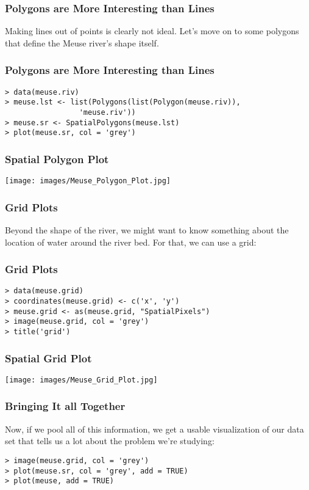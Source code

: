 \documentclass{beamer}
\begin{document}
\begin{frame}[fragile]
	\frametitle{Polygons are More Interesting than Lines}
	
	Making lines out of points is clearly not ideal. Let's move on to some polygons that define the Meuse river's shape itself.
\end{frame}

\begin{frame}[fragile]
	\frametitle{Polygons are More Interesting than Lines}

	\begin{verbatim}
> data(meuse.riv)
> meuse.lst <- list(Polygons(list(Polygon(meuse.riv)),
			     'meuse.riv'))
> meuse.sr <- SpatialPolygons(meuse.lst)
> plot(meuse.sr, col = 'grey')
	\end{verbatim}
\end{frame}

\frame
{	
	\frametitle{Spatial Polygon Plot}
	
	\begin{center}
		\texttt{[image: images/Meuse\_Polygon\_Plot.jpg]}
	\end{center}
}

\begin{frame}[fragile]
	\frametitle{Grid Plots}
	
	Beyond the shape of the river, we might want to know something about the location of water around the river bed. For that, we can use a grid:
\end{frame}

\begin{frame}[fragile]
	\frametitle{Grid Plots}
	
	\begin{verbatim}
> data(meuse.grid)
> coordinates(meuse.grid) <- c('x', 'y')
> meuse.grid <- as(meuse.grid, "SpatialPixels")
> image(meuse.grid, col = 'grey')
> title('grid')
	\end{verbatim}
\end{frame}

\frame
{	
	\frametitle{Spatial Grid Plot}
	
	\begin{center}
		\texttt{[image: images/Meuse\_Grid\_Plot.jpg]}
	\end{center}
}

\begin{frame}[fragile]
	\frametitle{Bringing It all Together}
	
	Now, if we pool all of this information, we get a usable visualization of our data set that tells us a lot about the problem we're studying:

	\begin{verbatim}
> image(meuse.grid, col = 'grey')
> plot(meuse.sr, col = 'grey', add = TRUE)
> plot(meuse, add = TRUE)
	\end{verbatim}
\end{frame}
\end{document}
